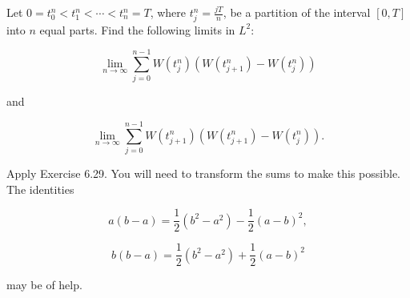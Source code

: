 \begin{Exercise}
\label{ex:7.1}
Let $0 = t_0^n < t_1^n < \cdots < t_n^n = T$, where $t_j^n = \frac{jT}{n}$, be a partition of the interval $[0, T]$ into $n$ equal parts. Find the following limits in $L^2$:

\begin{equation}
\lim_{n \to \infty} \sum_{j=0}^{n-1} W(t_j^n)\left(W(t_{j+1}^n) - W(t_j^n)\right)
\end{equation}

and

\begin{equation}
\lim_{n \to \infty} \sum_{j=0}^{n-1} W\left(t_{j+1}^n\right)\left(W\left(t_{j+1}^n\right) - W\left(t_j^n\right)\right).
\end{equation}

\begin{hint}
Apply Exercise 6.29. You will need to transform the sums to make this possible. The identities

\begin{equation}
a(b - a) = \frac{1}{2}(b^2 - a^2) - \frac{1}{2}(a - b)^2,
\end{equation}

\begin{equation}
b(b - a) = \frac{1}{2}(b^2 - a^2) + \frac{1}{2}(a - b)^2
\end{equation}

may be of help.
\end{hint}
\end{Exercise}

